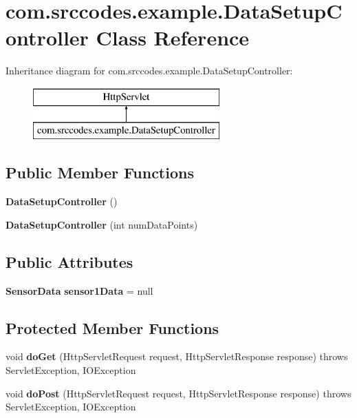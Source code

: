 \section{com.\-srccodes.\-example.\-Data\-Setup\-Controller Class Reference}
\label{classcom_1_1srccodes_1_1example_1_1_data_setup_controller}
Inheritance diagram for com.\-srccodes.\-example.\-Data\-Setup\-Controller\-:\begin{figure}[H]
\begin{center}
\leavevmode
\includegraphics[height=2.000000cm]{d8/dab/classcom_1_1srccodes_1_1example_1_1_data_setup_controller}
\end{center}
\end{figure}
\subsection*{Public Member Functions}
\begin{DoxyCompactItemize}
\item 
{\bf Data\-Setup\-Controller} ()
\item 
{\bf Data\-Setup\-Controller} (int num\-Data\-Points)
\end{DoxyCompactItemize}
\subsection*{Public Attributes}
\begin{DoxyCompactItemize}
\item 
{\bf Sensor\-Data} {\bf sensor1\-Data} = null
\end{DoxyCompactItemize}
\subsection*{Protected Member Functions}
\begin{DoxyCompactItemize}
\item 
void {\bf do\-Get} (Http\-Servlet\-Request request, Http\-Servlet\-Response response)  throws Servlet\-Exception, I\-O\-Exception 
\item 
void {\bf do\-Post} (Http\-Servlet\-Request request, Http\-Servlet\-Response response)  throws Servlet\-Exception, I\-O\-Exception 
\end{DoxyCompactItemize}
